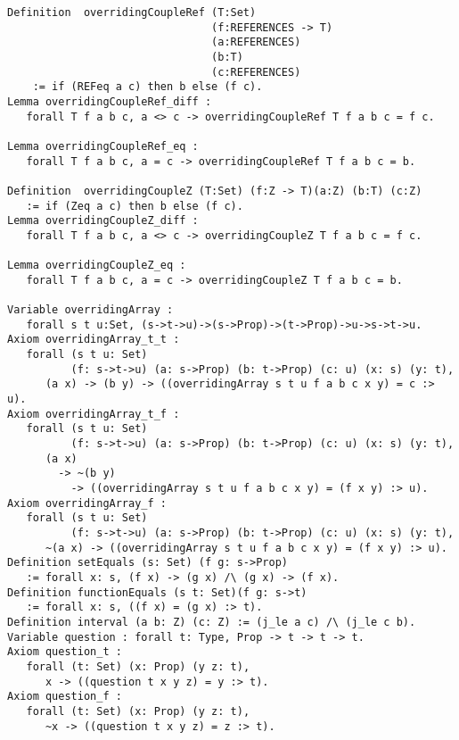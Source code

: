 \begin{verbatim}
Definition  overridingCoupleRef (T:Set) 
                                (f:REFERENCES -> T)
                                (a:REFERENCES) 
                                (b:T) 
                                (c:REFERENCES) 
    := if (REFeq a c) then b else (f c).
Lemma overridingCoupleRef_diff : 
   forall T f a b c, a <> c -> overridingCoupleRef T f a b c = f c.

Lemma overridingCoupleRef_eq : 
   forall T f a b c, a = c -> overridingCoupleRef T f a b c = b.

Definition  overridingCoupleZ (T:Set) (f:Z -> T)(a:Z) (b:T) (c:Z) 
   := if (Zeq a c) then b else (f c).
Lemma overridingCoupleZ_diff : 
   forall T f a b c, a <> c -> overridingCoupleZ T f a b c = f c.

Lemma overridingCoupleZ_eq : 
   forall T f a b c, a = c -> overridingCoupleZ T f a b c = b. 

Variable overridingArray : 
   forall s t u:Set, (s->t->u)->(s->Prop)->(t->Prop)->u->s->t->u.
Axiom overridingArray_t_t : 
   forall (s t u: Set) 
          (f: s->t->u) (a: s->Prop) (b: t->Prop) (c: u) (x: s) (y: t), 
      (a x) -> (b y) -> ((overridingArray s t u f a b c x y) = c :> u).
Axiom overridingArray_t_f : 
   forall (s t u: Set) 
          (f: s->t->u) (a: s->Prop) (b: t->Prop) (c: u) (x: s) (y: t), 
      (a x) 
        -> ~(b y) 
          -> ((overridingArray s t u f a b c x y) = (f x y) :> u).
Axiom overridingArray_f : 
   forall (s t u: Set) 
          (f: s->t->u) (a: s->Prop) (b: t->Prop) (c: u) (x: s) (y: t), 
      ~(a x) -> ((overridingArray s t u f a b c x y) = (f x y) :> u).
Definition setEquals (s: Set) (f g: s->Prop) 
   := forall x: s, (f x) -> (g x) /\ (g x) -> (f x).
Definition functionEquals (s t: Set)(f g: s->t) 
   := forall x: s, ((f x) = (g x) :> t).
Definition interval (a b: Z) (c: Z) := (j_le a c) /\ (j_le c b).
Variable question : forall t: Type, Prop -> t -> t -> t.
Axiom question_t : 
   forall (t: Set) (x: Prop) (y z: t), 
      x -> ((question t x y z) = y :> t).
Axiom question_f : 
   forall (t: Set) (x: Prop) (y z: t), 
      ~x -> ((question t x y z) = z :> t).
\end{verbatim}
